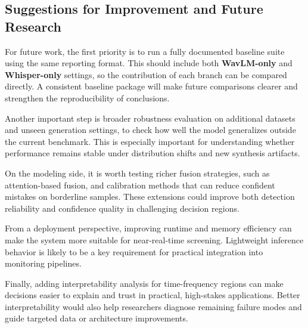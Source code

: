 \documentclass[11pt,a4paper]{article}
\begin{document}
\subsection{Suggestions for Improvement and Future Research}

For future work, the first priority is to run a fully documented baseline suite
using the same reporting format. This should include both \textbf{WavLM-only} and
\textbf{Whisper-only} settings, so the contribution of each branch can be compared
directly. A consistent baseline package will make future comparisons clearer and
strengthen the reproducibility of conclusions.

Another important step is broader robustness evaluation on additional datasets and
unseen generation settings, to check how well the model generalizes outside the
current benchmark. This is especially important for understanding whether
performance remains stable under distribution shifts and new synthesis artifacts.

On the modeling side, it is worth testing richer fusion strategies, such as
attention-based fusion, and calibration methods that can reduce confident mistakes
on borderline samples. These extensions could improve both detection reliability
and confidence quality in challenging decision regions.

From a deployment perspective, improving runtime and memory efficiency can make
the system more suitable for near-real-time screening. Lightweight inference
behavior is likely to be a key requirement for practical integration into
monitoring pipelines.

Finally, adding interpretability analysis for time-frequency regions can make
decisions easier to explain and trust in practical, high-stakes applications.
Better interpretability would also help researchers diagnose remaining failure
modes and guide targeted data or architecture improvements.
\end{document}
